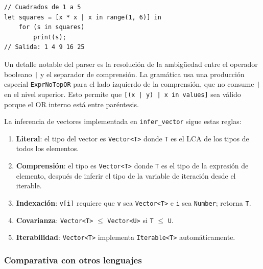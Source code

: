 \documentclass[12pt, a4paper]{article}
\begin{document}
\begin{lstlisting}[caption={Comprensión de vector al estilo funcional},
                   label=lst:vec-comp]
// Cuadrados de 1 a 5
let squares = [x * x | x in range(1, 6)] in
    for (s in squares)
        print(s);
// Salida: 1 4 9 16 25
\end{lstlisting}

Un detalle notable del parser es la resolución de la ambigüedad entre el
operador booleano \texttt{|} y el separador de comprensión. La gramática usa
una producción especial \texttt{ExprNoTopOR} para el lado izquierdo de la
comprensión, que no consume \texttt{|} en el nivel superior. Esto permite
que \texttt{[(x | y) | x in values]} sea válido porque el OR interno está
entre paréntesis.

La inferencia de vectores implementada en \texttt{infer\_vector} sigue estas reglas:

\begin{enumerate}[leftmargin=*, label=\arabic*.]
    \item \textbf{Literal}: el tipo del vector es \texttt{Vector<T>} donde
          \texttt{T} es el LCA de los tipos de todos los elementos.
    \item \textbf{Comprensión}: el tipo es \texttt{Vector<T>} donde \texttt{T}
          es el tipo de la expresión de elemento, después de inferir el tipo de
          la variable de iteración desde el iterable.
    \item \textbf{Indexación}: \texttt{v[i]} requiere que \texttt{v} sea
          \texttt{Vector<T>} e \texttt{i} sea \texttt{Number}; retorna \texttt{T}.
    \item \textbf{Covarianza}: \texttt{Vector<T>} $\leq$ \texttt{Vector<U>}
          si \texttt{T} $\leq$ \texttt{U}.
    \item \textbf{Iterabilidad}: \texttt{Vector<T>} implementa
          \texttt{Iterable<T>} automáticamente.
\end{enumerate}

\subsubsection{Comparativa con otros lenguajes}
\end{document}
